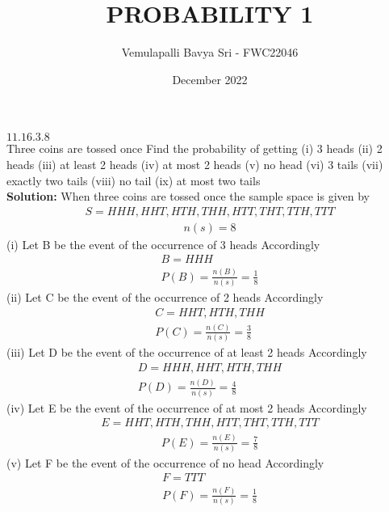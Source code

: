 \documentclass{article}
\newcommand{\solution}{\noindent \textbf{Solution: }}
\begin{document}
\title{\textbf{PROBABILITY 1}}
\author{Vemulapalli Bavya Sri - FWC22046}
\date{December 2022}


\maketitle

$\mathbf{11.16.3.8}$\\
    Three coins are tossed once Find the probability of getting (i) 3 heads  (ii) 2 heads   (iii) at least 2 heads   (iv) at most 2 heads  (v) no head  (vi) 3 tails   (vii) exactly two tails  (viii) no tail  (ix) at most two tails\\

\solution
When three coins are tossed once the sample space is given by
\vspace{0.1cm}
\begin{align}
   S=HHH,HHT,HTH,THH,HTT,THT,TTH,TTT 
\end{align}
\begin{align}
    n(s) = 8
\end{align}
(i) Let B be the event of the occurrence of 3 heads Accordingly 
\begin{align}
    B=HHH\\
    P(B) = \frac{n(B)}{n(s)} = \frac{1}{8}
\end{align}
(ii) Let C be the event of the occurrence of 2 heads Accordingly
\begin{align}
    C=HHT,HTH,THH\\
    P(C) = \frac{n(C)}{n(s)} = \frac{3}{8}
\end{align}
(iii) Let D be the event of the occurrence of at least 2 heads
Accordingly \\
\begin{align}
    D=HHH,HHT,HTH,THH\\
    P(D) = \frac{n(D)}{n(s)} = \frac{4}{8}
\end{align}
(iv) Let E be the event of the occurrence of at most 2 heads
Accordingly \\
\begin{align}
    E=HHT,HTH,THH,HTT,THT,TTH,TTT
\end{align}
\begin{align}
    P(E) = \frac{n(E)}{n(s)} = \frac{7}{8}
\end{align}
(v) Let F be the event of the occurrence of no head
Accordingly\\
\begin{align}
    F=TTT\\
    P(F) = \frac{n(F)}{n(s)} = \frac{1}{8}
\end{align}
\end{document}
